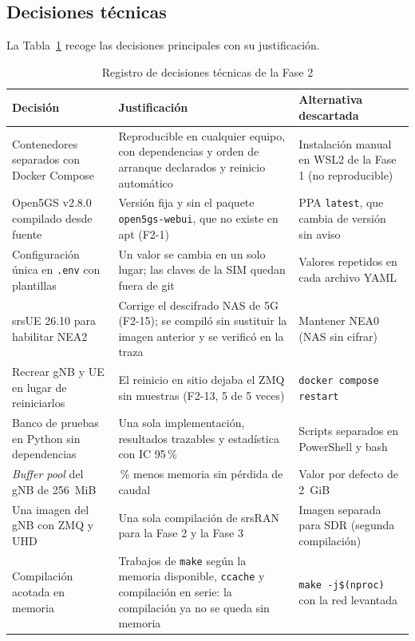 \documentclass[conference]{IEEEtran}
\begin{document}
\subsection{Decisiones técnicas}
La Tabla~\ref{tab:decisiones} recoge las decisiones principales con su justificación.

\begin{table}[!t]
\caption{Registro de decisiones técnicas de la Fase 2}
\label{tab:decisiones}
\centering
\footnotesize
\renewcommand{\arraystretch}{1.15}
\begin{tabular}{>{\raggedright\arraybackslash}p{3.6cm}>{\raggedright\arraybackslash}p{6.6cm}>{\raggedright\arraybackslash}p{6.4cm}}
\toprule
\textbf{Decisión} & \textbf{Justificación} & \textbf{Alternativa descartada} \\
\midrule
Contenedores separados con Docker Compose & Reproducible en cualquier equipo, con dependencias y orden de arranque declarados y reinicio automático & Instalación manual en WSL2 de la Fase 1 (no reproducible) \\
Open5GS v2.8.0 compilado desde fuente & Versión fija y sin el paquete \texttt{open5gs-webui}, que no existe en apt (F2-1) & PPA \texttt{latest}, que cambia de versión sin aviso \\
Configuración única en \texttt{.env} con plantillas & Un valor se cambia en un solo lugar; las claves de la SIM quedan fuera de git & Valores repetidos en cada archivo YAML \\
srsUE 26.10 para habilitar NEA2 & Corrige el descifrado NAS de 5G (F2-15); se compiló sin sustituir la imagen anterior y se verificó en la traza & Mantener NEA0 (NAS sin cifrar) \\
Recrear gNB y UE en lugar de reiniciarlos & El reinicio en sitio dejaba el ZMQ sin muestras (F2-13, 5 de 5 veces) & \texttt{docker compose restart} \\
Banco de pruebas en Python sin dependencias & Una sola implementación, resultados trazables y estadística con IC 95\,\% & Scripts separados en PowerShell y bash \\
\textit{Buffer pool} del gNB de 256~MiB & 72\,\% menos memoria sin pérdida de caudal & Valor por defecto de 2~GiB \\
Una imagen del gNB con ZMQ y UHD & Una sola compilación de srsRAN para la Fase 2 y la Fase 3 & Imagen separada para SDR (segunda compilación) \\
Compilación acotada en memoria & Trabajos de \texttt{make} según la memoria disponible, \texttt{ccache} y compilación en serie: la compilación ya no se queda sin memoria & \texttt{make -j\$(nproc)} con la red levantada \\
\bottomrule
\end{tabular}
\end{table}
\end{document}
